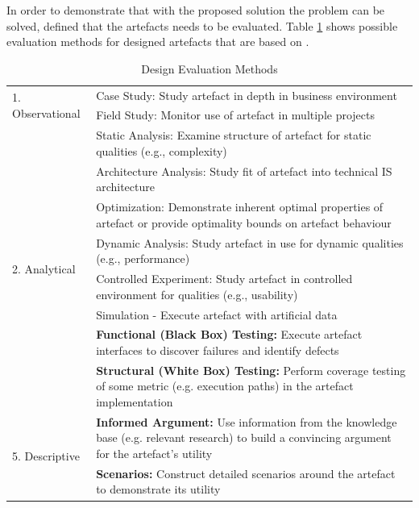 In order to demonstrate that with the proposed solution the problem can be solved, \cite{Hevner2010}  defined that the artefacts needs to be evaluated.
Table \ref{tbl:designevaluationmethods} shows possible evaluation methods for designed artefacts that are based on \cite{Hevner2004}.
\begin{table}[h]
	\begin{center}
		\begin{tabular}{ | m{4cm} | p{10cm} | } 
			\hline
			\multirow{2}{*}{1. Observational} &
				Case Study: Study artefact in depth in business environment \\
				\cline{2-2}
				& Field Study: Monitor use of artefact in multiple projects \\
			\hline
			\multirow{8}{*}{2. Analytical} &
				Static Analysis: Examine structure of artefact for static qualities (e.g., complexity) \\
				\cline{2-2}
				& Architecture Analysis: Study fit of artefact into technical IS architecture \\
				\cline{2-2}
				& Optimization: Demonstrate inherent optimal properties of artefact or provide optimality bounds on artefact behaviour \\
				\cline{2-2}
				& Dynamic Analysis: Study artefact in use for dynamic qualities (e.g., performance) \\
			\hline
			\multirow{3}{*}{3. Experimental} &
				Controlled Experiment: Study artefact in controlled environment for qualities (e.g., usability) \\
				\cline{2-2}
				& Simulation - Execute artefact with artificial data \\
			\hline
			\multirow{5}{*}{4. Testing} &
				\cellcolor{green!25}\textbf{Functional (Black Box) Testing:} Execute artefact interfaces to discover failures and identify defects \\
				\hhline{|~|-|}
				& \cellcolor{green!25}\textbf{Structural (White Box) Testing:} Perform coverage testing of some metric (e.g. execution paths) in the artefact implementation \\
			\hline
			\multirow{5}{*}{5. Descriptive} &
				\cellcolor{green!25}\textbf{Informed Argument:} Use information from the knowledge base (e.g. relevant research) to build a convincing argument for the artefact's utility \\
				\hhline{|~|-|}
				& \cellcolor{green!25}\textbf{Scenarios:} Construct detailed scenarios around the artefact to demonstrate its utility \\
			\hline
		\end{tabular}
		\caption[Design Evaluation Methods]{Design Evaluation Methods \citep[based on][]{Hevner2004}}
		\label{tbl:designevaluationmethods}
	\end{center}
\end{table} \newline
